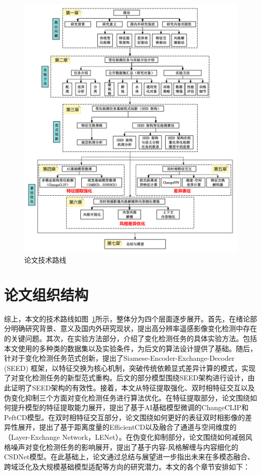 \begin{figure}[!htbp]
  \centering
  \includegraphics[width=\textwidth]{paper_figures/绪论/论文章节技术路线图.png}
  \caption{论文技术路线}
  \label{fig:paper_overall}
\end{figure}

\section{论文组织结构}
综上，本文的技术路线如图~\ref{fig:paper_overall}所示，整体分为四个层面逐步展开。首先，在绪论部分明确研究背景、意义及国内外研究现状，提出高分辨率遥感影像变化检测中存在的关键问题。其次，在实验方法部分，介绍了变化检测任务的具体实验方法。包括本文使用的多种类的数据集以及实验条件，为后文的算法设计提供了基础。随后，针对于变化检测任务范式创新，提出了Siamese-Encoder-Exchange-Decoder (SEED) 框架，以特征交换为核心机制，突破传统依赖显式差异计算的模式，实现了对变化检测任务的新型范式重构。后文的部分模型围绕SEED架构进行设计，由此证明了SEED架构的有效性。接着，本文从特征提取强化、双时相特征交互以及伪变化抑制三个方面对变化检测任务进行算法优化。在特征提取部分，论文围绕如何提升模型的特征提取能力展开，提出了基于AI基础模型微调的ChangeCLIP和PeftCD模型。在双时相特征交互部分，论文围绕如何更好的表征双时相影像的差异性展开，提出了基于距离度量的EfficientCD以及融合了通道与空间维度的（Layer-Exchange Network，LENet）。在伪变化抑制部分，论文围绕如何减弱风格噪声对变化检测任务的影响展开，提出了基于内容-风格解缠与内容细化的CSDNet模型。在此基础上，论文通过总结与展望进一步指出未来在多模态融合、跨域泛化及大规模基础模型适配等方向的研究潜力。本文的各个章节安排如下：

